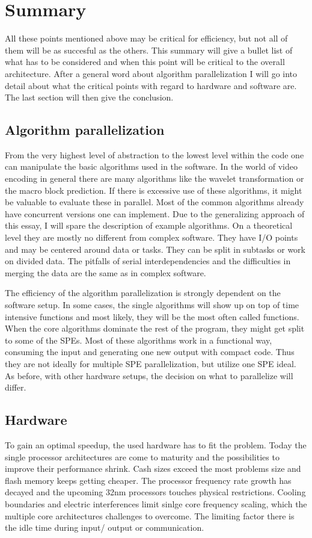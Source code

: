 \section{Summary}
\label{sec:summary}
All these points mentioned above may be critical for efficiency, but not all of them will be as succesful as the others. This summary will give a bullet list of what has to be considered and when this point will be critical to the overall architecture. After a general word about algorithm parallelization I will go into detail about what the critical points with regard to hardware and software are. The last section will then give the conclusion.

\subsection{Algorithm parallelization}
\label{subsec:algorithm}
 From the very highest level of abstraction to the lowest level within the code one can manipulate the basic algorithms used in the software. In the world of video encoding in general there are many algorithms like the wavelet transformation or the macro block prediction. If there is excessive use of these algorithms, it might be valuable to evaluate these in parallel. Most of the common algorithms already have concurrent versions one can implement. Due to the generalizing approach of this essay, I will spare the description of example algorithms. On a theoretical level they are mostly no different from complex software. They have I/O points and may be centered around data or tasks. They can be split in subtasks or work on divided data. The pitfalls of serial interdependencies and the difficulties in merging the data are the same as in complex software.

The efficiency of the algorithm parallelization is strongly dependent on the software setup. In some cases, the single algorithms will show up on top of time intensive functions and most likely, they will be the most often called functions. When the core algorithms dominate the rest of the program, they might get split to some of the SPEs. Most of these algorithms work in a functional way, consuming the input and generating one new output with compact code. Thus they are not ideally for multiple SPE parallelization, but utilize one SPE ideal. As before, with other hardware setups, the decision on what to parallelize will differ.


\subsection{Hardware}
\label{subsec:hardware}
To gain an optimal speedup, the used hardware has to fit the problem. Today the single processor architectures are come to maturity and the possibilities to improve their performance shrink. Cash sizes exceed the most problems size and flash memory keeps getting cheaper. The processor frequency rate growth has decayed and the upcoming 32nm processors touches physical restrictions. Cooling boundaries and electric interferences limit sinlge core frequency scaling, which the multiple core architectures challenges to overcome. The limiting factor there is the idle time during input/ output or communication.

